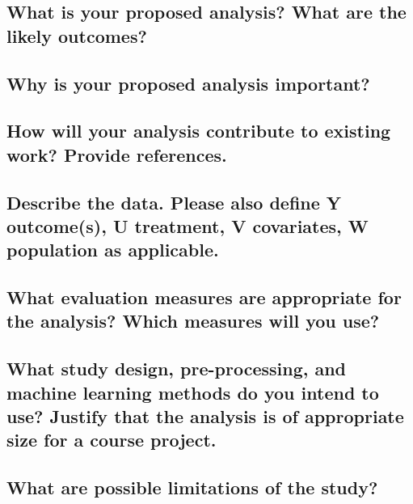 \documentclass[twoside,11pt]{article}
\begin{document}
\subsection{What is your proposed analysis? What are the likely outcomes?}


\subsection{Why is your proposed analysis important?}


\subsection{How will your analysis contribute to existing work? Provide references.}


\subsection{Describe the data. Please also define Y outcome(s), U treatment, V covariates, W population as applicable.}


\subsection{What evaluation measures are appropriate for the analysis? Which measures will you use?}


\subsection{What study design, pre-processing, and machine learning methods do you intend to use? Justify that the analysis is of appropriate size for a course project.}


\subsection{What are possible limitations of the study?}



\end{document}
